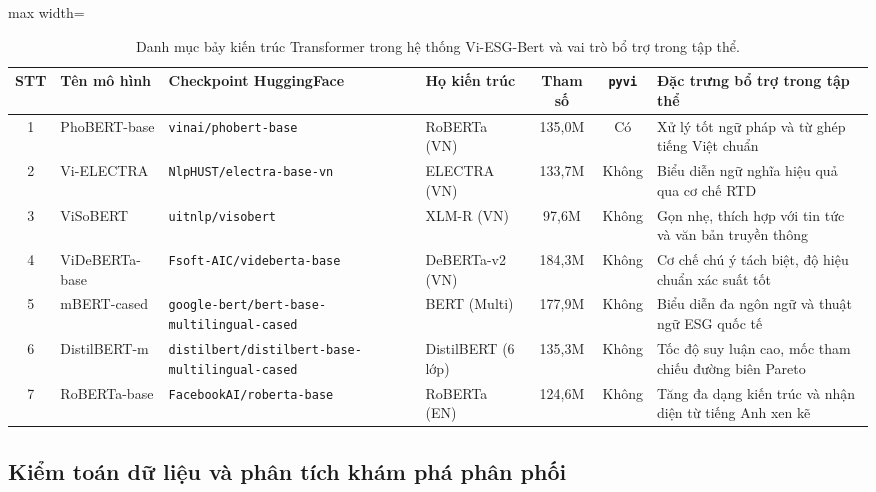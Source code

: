 \documentclass[journal,a4paper]{IEEEtran}
\newcommand{\code}[1]{\texttt{\small #1}}
\begin{document}
\begin{table}[!t]
\centering
\caption{Danh mục bảy kiến trúc Transformer trong hệ thống Vi-ESG-Bert và vai trò bổ trợ trong tập thể.}
\label{tab:models}
\footnotesize
\renewcommand{\arraystretch}{1.15}
\setlength{\tabcolsep}{4pt}
\begin{adjustbox}{max width=\textwidth}
\begin{tabular}{@{}clllccl@{}}
\toprule
\textbf{STT} & \textbf{Tên mô hình} & \textbf{Checkpoint HuggingFace} & \textbf{Họ kiến trúc} & \textbf{Tham số} & \textbf{\code{pyvi}} & \textbf{Đặc trưng bổ trợ trong tập thể} \\
\midrule
1 & PhoBERT-base & \code{vinai/phobert-base} & RoBERTa (VN) & 135,0M & Có & Xử lý tốt ngữ pháp và từ ghép tiếng Việt chuẩn \\
2 & Vi-ELECTRA & \code{NlpHUST/electra-base-vn} & ELECTRA (VN) & 133,7M & Không & Biểu diễn ngữ nghĩa hiệu quả qua cơ chế RTD \\
3 & ViSoBERT & \code{uitnlp/visobert} & XLM-R (VN) & 97,6M & Không & Gọn nhẹ, thích hợp với tin tức và văn bản truyền thông \\
4 & ViDeBERTa-base & \code{Fsoft-AIC/videberta-base} & DeBERTa-v2 (VN) & 184,3M & Không & Cơ chế chú ý tách biệt, độ hiệu chuẩn xác suất tốt \\
5 & mBERT-cased & \code{google-bert/bert-base-multilingual-cased} & BERT (Multi) & 177,9M & Không & Biểu diễn đa ngôn ngữ và thuật ngữ ESG quốc tế \\
6 & DistilBERT-m & \code{distilbert/distilbert-base-multilingual-cased} & DistilBERT (6 lớp) & 135,3M & Không & Tốc độ suy luận cao, mốc tham chiếu đường biên Pareto \\
7 & RoBERTa-base & \code{FacebookAI/roberta-base} & RoBERTa (EN) & 124,6M & Không & Tăng đa dạng kiến trúc và nhận diện từ tiếng Anh xen kẽ \\
\bottomrule
\end{tabular}
\end{adjustbox}
\end{table}

\subsection{Kiểm toán dữ liệu và phân tích khám phá phân phối}
\end{document}
